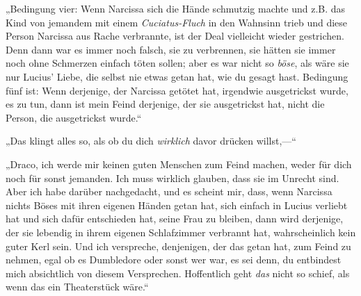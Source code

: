 „Bedingung vier: Wenn Narcissa sich die Hände schmutzig machte und z.B. das Kind von jemandem mit einem \emph{Cuciatus-Fluch} in den Wahnsinn trieb und diese Person Narcissa aus Rache verbrannte, ist der Deal vielleicht wieder gestrichen. Denn dann war es immer noch falsch, sie zu verbrennen, sie hätten sie immer noch ohne Schmerzen einfach töten sollen; aber es war nicht so \emph{böse}, als wäre sie nur Lucius' Liebe, die selbst nie etwas getan hat, wie du gesagt hast. Bedingung fünf ist: Wenn derjenige, der Narcissa getötet hat, irgendwie ausgetrickst wurde, es zu tun, dann ist mein Feind derjenige, der sie ausgetrickst hat, nicht die Person, die ausgetrickst wurde.“

„Das klingt alles so, als ob du dich \emph{wirklich} davor drücken willst,—“

„Draco, ich werde mir keinen guten Menschen zum Feind machen, weder für dich noch für sonst jemanden. Ich muss wirklich glauben, dass sie im Unrecht sind. Aber ich habe darüber nachgedacht, und es scheint mir, dass, wenn Narcissa nichts Böses mit ihren eigenen Händen getan hat, sich einfach in Lucius verliebt hat und sich dafür entschieden hat, seine Frau zu bleiben, dann wird derjenige, der sie lebendig in ihrem eigenen Schlafzimmer verbrannt hat, wahrscheinlich kein guter Kerl sein. Und ich verspreche, denjenigen, der das getan hat, zum Feind zu nehmen, egal ob es Dumbledore oder sonst wer war, es sei denn, du entbindest mich absichtlich von diesem Versprechen. Hoffentlich geht \emph{das} nicht so schief, als wenn das ein Theaterstück wäre.“

